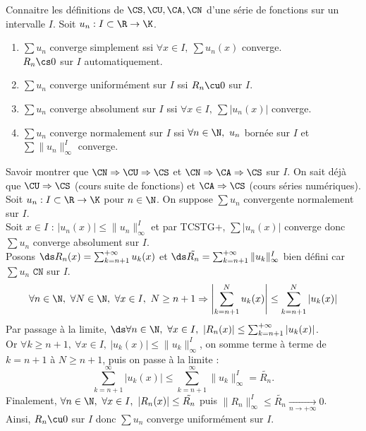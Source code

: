 \documentclass[french, 11pt]{article}
\begin{document}
\begin{exercice}{}{}
    Connaitre les définitions de $\CS, \CU, \CA, \CN$ d'une série de fonctions sur un intervalle $I$.
    \tcblower
    Soit $u_n:I\subset\R\to\K$.
    \begin{enumerate}
        \item $\sum u_n$ converge simplement ssi $\forall x \in I, ~ \sum u_n(x)$ converge.\\
        $R_n\cs0$ sur $I$ automatiquement.
        \item $\sum u_n$ converge uniformément sur $I$ ssi $R_n\cu0$ sur $I$.
        \item $\sum u_n$ converge absolument sur $I$ ssi $\forall x \in I, ~ \sum|u_n(x)|$ converge.
        \item $\sum u_n$ converge normalement sur $I$ ssi $\forall n \in \N, ~ u_n$ bornée sur $I$ et $\sum\|u_n\|_\infty^I$ converge.
    \end{enumerate}
\end{exercice}

\begin{exercice}{}{}
    Savoir montrer que $\CN \Rightarrow \CU \Rightarrow \CS$ et $\CN \Rightarrow \CA \Rightarrow \CS$ sur $I$.
    \tcblower
    On sait déjà que $\CU \Rightarrow \CS$ (cours suite de fonctions) et $\CA \Rightarrow \CS$ (cours séries numériques).\\
    \boxed{$\CN \Rightarrow \CA$} Soit $u_n:I\subset\R\to\K$ pour $n\in\N$. On suppose $\sum u_n$ convergente normalement sur $I$.\\
    Soit $x\in I$ : $|u_n(x)|\leq\|u_n\|_\infty^I$ et par TCSTG+, $\sum|u_n(x)|$ converge donc $\sum u_n$ converge absolument sur $I$.\\
    \boxed{$\CN\Rightarrow\CU$} Posons $\ds R_n(x)=\sum_{k=n+1}^{+\infty}u_k(x)$ et $\ds \tilde{R_n}=\sum_{k=n+1}^{+\infty}\|u_k\|_\infty^I$ bien défini car $\sum u_n$ $\texttt{CN}$ sur $I$.
    \begin{equation*}\forall n \in \N, ~ \forall N\in\N, ~ \forall x \in I, ~ N\geq n+1 \Rightarrow \left|\sum_{k=n+1}^Nu_k(x)\right|\leq\sum_{k=n+1}^N\left|u_k(x)\right|\end{equation*}
    Par passage à la limite, $\ds \forall n \in \N, ~ \forall x \in I, ~ |R_n(x)|\leq\sum_{k=n+1}^{+\infty}|u_k(x)|$.\\
    Or $\forall k \geq n+1, ~ \forall x \in I, ~ |u_k(x)|\leq\|u_k\|_\infty^I$, on somme terme à terme de $k=n+1$ à $N\geq n+1$, puis on passe à la limite :
    \begin{equation*}
        \sum_{k=n+1}^{\infty}|u_k(x)| \leq \sum_{k=n+1}^{\infty}\|u_k\|_{\infty}^I = \tilde{R_n}.
    \end{equation*}
    Finalement, $\forall n \in \N, ~ \forall x \in I, ~ |R_n(x)|\leq\tilde{R_n}$ puis $\|R_n\|_\infty^I\leq\tilde{R_n}\xrightarrow[n\to+\infty]{}0$.\\
    Ainsi, $R_n\cu0$ sur $I$ donc $\sum u_n$ converge uniformément sur $I$.
\end{exercice}
\end{document}
